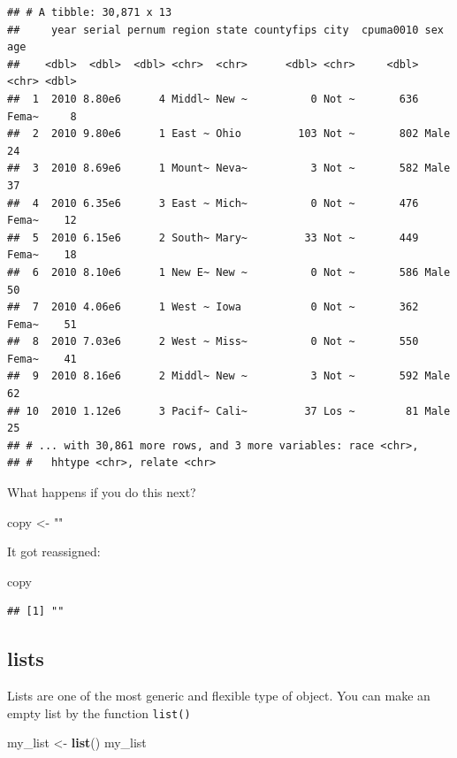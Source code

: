 \documentclass[]{book}
\newenvironment{Shaded}{\begin{snugshade}}{\end{snugshade}}
\newcommand{\KeywordTok}[1]{\textcolor[rgb]{0.13,0.29,0.53}{\textbf{#1}}}
\newcommand{\NormalTok}[1]{#1}
\newcommand{\StringTok}[1]{\textcolor[rgb]{0.31,0.60,0.02}{#1}}
\theoremstyle{definition}
\theoremstyle{definition}
\theoremstyle{definition}
\theoremstyle{remark}
\begin{document}
\begin{verbatim}
## # A tibble: 30,871 x 13
##     year serial pernum region state countyfips city  cpuma0010 sex     age
##    <dbl>  <dbl>  <dbl> <chr>  <chr>      <dbl> <chr>     <dbl> <chr> <dbl>
##  1  2010 8.80e6      4 Middl~ New ~          0 Not ~       636 Fema~     8
##  2  2010 9.80e6      1 East ~ Ohio         103 Not ~       802 Male     24
##  3  2010 8.69e6      1 Mount~ Neva~          3 Not ~       582 Male     37
##  4  2010 6.35e6      3 East ~ Mich~          0 Not ~       476 Fema~    12
##  5  2010 6.15e6      2 South~ Mary~         33 Not ~       449 Fema~    18
##  6  2010 8.10e6      1 New E~ New ~          0 Not ~       586 Male     50
##  7  2010 4.06e6      1 West ~ Iowa           0 Not ~       362 Fema~    51
##  8  2010 7.03e6      2 West ~ Miss~          0 Not ~       550 Fema~    41
##  9  2010 8.16e6      2 Middl~ New ~          3 Not ~       592 Male     62
## 10  2010 1.12e6      3 Pacif~ Cali~         37 Los ~        81 Male     25
## # ... with 30,861 more rows, and 3 more variables: race <chr>,
## #   hhtype <chr>, relate <chr>
\end{verbatim}

What happens if you do this next?

\begin{Shaded}
\begin{Highlighting}[]
\NormalTok{copy <-}\StringTok{ ""}
\end{Highlighting}
\end{Shaded}

It got reassigned:

\begin{Shaded}
\begin{Highlighting}[]
\NormalTok{copy}
\end{Highlighting}
\end{Shaded}

\begin{verbatim}
## [1] ""
\end{verbatim}

\hypertarget{lists}{%
\subsection{lists}\label{lists}}

Lists are one of the most generic and flexible type of object. You can make an empty list by the function \texttt{list()}

\begin{Shaded}
\begin{Highlighting}[]
\NormalTok{my_list <-}\StringTok{ }\KeywordTok{list}\NormalTok{()}
\NormalTok{my_list}
\end{Highlighting}
\end{Shaded}
\end{document}
